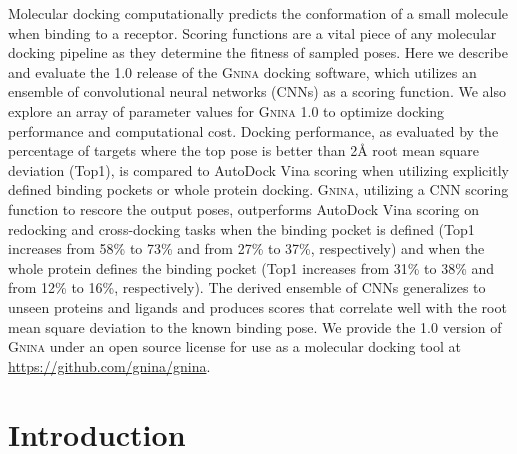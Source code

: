 \documentclass[linenumbers,doublespacing]{bmcart}
\begin{document}
\begin{frontmatter}
\begin{abstractbox}
Molecular docking computationally predicts the conformation of a small molecule when binding to a receptor. Scoring functions are a vital piece of any molecular docking pipeline as they determine the fitness of sampled poses. Here we describe and evaluate the 1.0 release of the \textsc{Gnina} docking software, which utilizes an ensemble of convolutional neural networks (CNNs) as a scoring function. We also explore an array of parameter values for \textsc{Gnina} 1.0 to optimize docking performance and computational cost. Docking performance, as evaluated by the percentage of targets where the top pose is better than 2{\AA} root mean square deviation (Top1), is compared to AutoDock Vina scoring when utilizing explicitly defined binding pockets or whole protein docking. \textsc{Gnina}, utilizing a CNN scoring function to rescore the output poses, outperforms AutoDock Vina scoring on redocking and cross-docking tasks when the binding pocket is defined (Top1 increases from 58\% to 73\% and from 27\% to 37\%, respectively) and when the whole protein defines the binding pocket (Top1 increases from 31\% to 38\% and from 12\% to 16\%, respectively). The derived ensemble of CNNs generalizes to unseen proteins and ligands and produces scores that correlate well with the root mean square deviation to the known binding pose. We provide the 1.0 version of \textsc{Gnina} under an open source license for use as a molecular docking tool at \url{https://github.com/gnina/gnina}.

\begin{keyword}
\end{keyword}

\end{abstractbox}

\end{frontmatter}
\section{Introduction}
\end{document}
